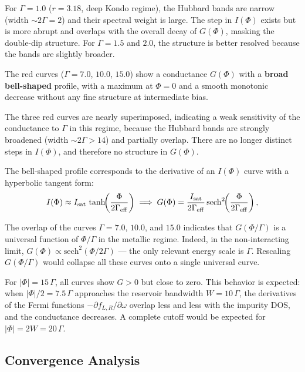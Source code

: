 \documentclass[preprint,1p]{elsarticle}
\begin{document}
For $\Gamma = 1.0$ ($r = 3.18$, deep Kondo regime),
the Hubbard bands are narrow (width $\sim 2\Gamma = 2$)
and their spectral weight is large. The step in $I(\Phi)$ exists
but is more abrupt and overlaps with the overall decay
of $G(\Phi)$, masking the double-dip structure. For $\Gamma = 1.5$ and
$2.0$, the structure is better resolved because the bands are
slightly broader.

The red curves ($\Gamma = 7.0$, $10.0$, $15.0$)
show a conductance $G(\Phi)$ with a \textbf{broad bell-shaped}
profile, with a maximum at $\Phi = 0$ and a smooth monotonic
decrease without any fine structure at intermediate bias.

The three red curves are nearly superimposed, indicating a
weak sensitivity of the conductance to $\Gamma$ in this regime,
because the Hubbard bands are strongly broadened
(width $\sim 2\Gamma > 14$) and partially overlap.
There are no longer distinct steps in $I(\Phi)$,
and therefore no structure in $G(\Phi)$.

The bell-shaped profile corresponds to the derivative of an
$I(\Phi)$ curve with a hyperbolic tangent form:
\begin{equation}
	I(\Phi) \approx I_{\rm sat}\,\tanh\!\!\left(\frac{\Phi}{2\Gamma_{\rm eff}}\right)
	\;\Longrightarrow\;
	G(\Phi) = \frac{I_{\rm sat}}{2\Gamma_{\rm eff}}
	\,\mathrm{sech}^2\!\!\left(\frac{\Phi}{2\Gamma_{\rm eff}}\right),
	\label{eq:Gtanh}
\end{equation}


The overlap of the curves $\Gamma = 7.0$, $10.0$, and $15.0$
indicates that $G(\Phi/\Gamma)$ is a universal function
of $\Phi/\Gamma$ in the metallic regime.
Indeed, in the non-interacting limit,
$G(\Phi) \propto \mathrm{sech}^2(\Phi/2\Gamma)$
— the only relevant energy scale is $\Gamma$.
Rescaling $G(\Phi/\Gamma)$ would collapse all these
curves onto a single universal curve.

For $|\Phi| = 15\,\Gamma$, all curves show $G > 0$
but close to zero. This behavior is expected:
when $|\Phi|/2 = 7.5\,\Gamma$ approaches the reservoir
bandwidth $W = 10\,\Gamma$, the derivatives of the Fermi functions
$-\partial f_{L,R}/\partial\omega$ overlap less and less
with the impurity DOS, and the conductance decreases.
A complete cutoff would be expected for $|\Phi| = 2W = 20\,\Gamma$.



\subsection{Convergence Analysis}
\label{sec:convergence}
\end{document}
